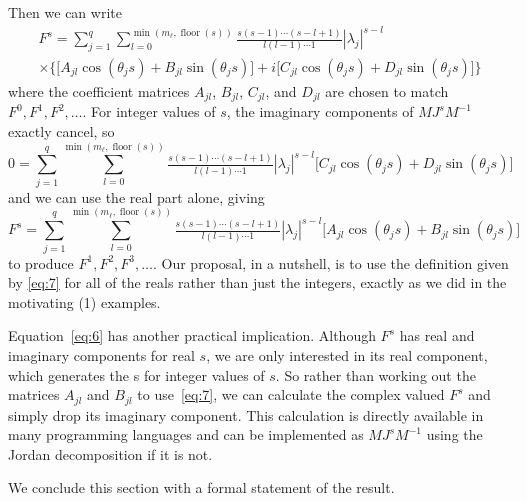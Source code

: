 \documentclass[12pt,fleqn]{article}
\DeclareMathOperator{\floor}{floor}
\newcommand{\AR}{\allcaps{AR}}
\begin{document}
Then we can write
\begin{multline}\label{eq:6}
  F^s =
  \sum_{j = 1}^q \sum_{l=0}^{\min(m_\ell, \floor(s))} \tfrac{s(s-1)\cdots(s-l+1)}{l (l - 1) \cdots 1} |\lambda_j|^{s-l} \\
  \times\Big\{\big[A_{jl} \cos(\theta_j s) + B_{jl} \sin(\theta_j s)\big] + i\big[C_{jl} \cos(\theta_j s) + D_{jl} \sin(\theta_j s)\big]\Big\}
\end{multline}
where the coefficient matrices $A_{jl}$, $B_{jl}$, $C_{jl}$, and
$D_{jl}$ are chosen to match $F^0, F^1, F^2,\dots$.
For integer values of $s$, the imaginary components of $M J^s M^{-1}$
exactly cancel, so
\begin{equation*}
  0 = \sum_{j = 1}^q \sum_{l=0}^{\min(m_\ell, \floor(s))} \tfrac{s(s-1)\cdots(s-l+1)}{l (l - 1) \cdots 1} |\lambda_j|^{s-l}
  \big[C_{jl} \cos(\theta_j s) + D_{jl} \sin(\theta_j s)\big]
\end{equation*}
and we can use the real part alone, giving
\begin{equation}\label{eq:7}
  F^s =
  \sum_{j = 1}^q \sum_{l=0}^{\min(m_\ell, \floor(s))} \tfrac{s(s-1)\cdots(s-l+1)}{l (l - 1) \cdots 1} |\lambda_j|^{s-l} \big[A_{jl} \cos(\theta_j s) + B_{jl} \sin(\theta_j s)\big]
\end{equation}
to produce $F^1, F^2, F^3,\dots$. Our proposal, in a nutshell, is to
use the definition given by \eqref{eq:7} for all of the reals rather
than just the integers, exactly as we did in the motivating \AR(1)
examples.

Equation~\eqref{eq:6} has another practical implication. Although
$F^s$ has real and imaginary components for real $s$, we are only
interested in its real component, which generates the \IRF s for
integer values of $s$. So rather than working out the matrices
$A_{jl}$ and $B_{jl}$ to use~\eqref{eq:7}, we can calculate the
complex valued $F^s$ and simply drop its imaginary component. This
calculation is directly available in many programming languages and
can be implemented as $M J^s M^{-1}$ using the Jordan decomposition if
it is not.

We conclude this section with a formal statement of the result.
\end{document}
